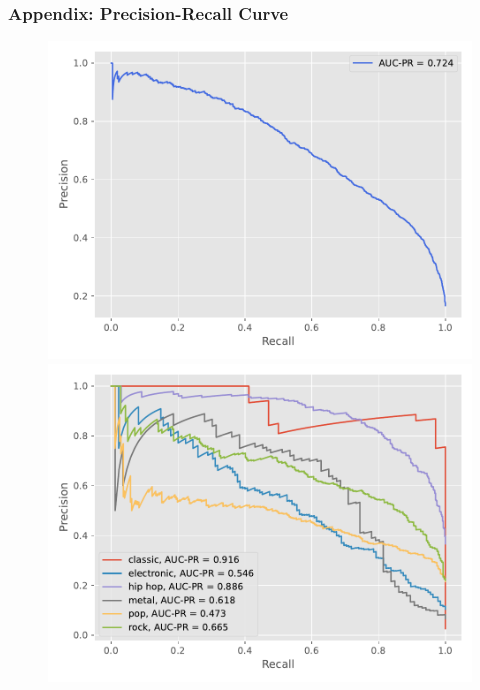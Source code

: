 \begin{frame}
    \frametitle{Appendix: Precision-Recall Curve}
    \begin{figure}
        \begin{minipage}[b]{0.48\textwidth}
            \centering
            \includegraphics[width=\textwidth]{../figures/PR_curve.pdf}
        \end{minipage}
        \hfill
        \begin{minipage}[b]{0.48\textwidth}
            \centering
            \includegraphics[width=\textwidth]{../figures/PR_curve_genres.pdf}
        \end{minipage}
    \end{figure}
\end{frame}
